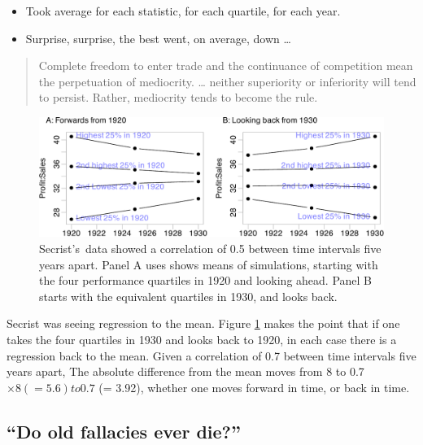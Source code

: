 \documentclass[
  10pt,
  b5paper]{book}
\providecommand{\tightlist}{%
  \setlength{\itemsep}{0pt}\setlength{\parskip}{0pt}}
\begin{document}
\begin{itemize}
\tightlist
\item
  Took average for each statistic, for each quartile, for each year.
\item
  Surprise, surprise, the best went, on average, down \ldots{}
\end{itemize}

\begin{quote}
Complete freedom to enter trade and the continuance of competition
mean the perpetuation of mediocrity. \ldots{} neither superiority or
inferiority will tend to persist. Rather, mediocrity tends to become
the rule.
\end{quote}

\begin{figure}[H]

{\centering \includegraphics[width=1.05\linewidth]{07-regress_files/figure-latex/sim-1} 

}

\caption{Secrist's data showed a correlation of 0.5 between
time intervals five years apart.  Panel A uses shows means of simulations,
starting with the four performance quartiles in 1920 and looking ahead.
Panel B starts with the equivalent quartiles in 1930, and looks back.}\label{fig:sim}
\end{figure}

Secrist was seeing regression to the mean. Figure \ref{fig:sim}
makes the point that if one takes the four quartiles in 1930 and looks
back to 1920, in each case there is a regression back to the mean.
Given a correlation of 0.7 between time intervals five years apart,
The absolute difference from the mean moves from 8 to 0.7\(\times 8 (= 5.6) to 0.7\) (= 3.92), whether one moves
forward in time, or back in time.

\hypertarget{do-old-fallacies-ever-die}{%
\subsection*{``Do old fallacies ever die?''}\label{do-old-fallacies-ever-die}}
\end{document}
